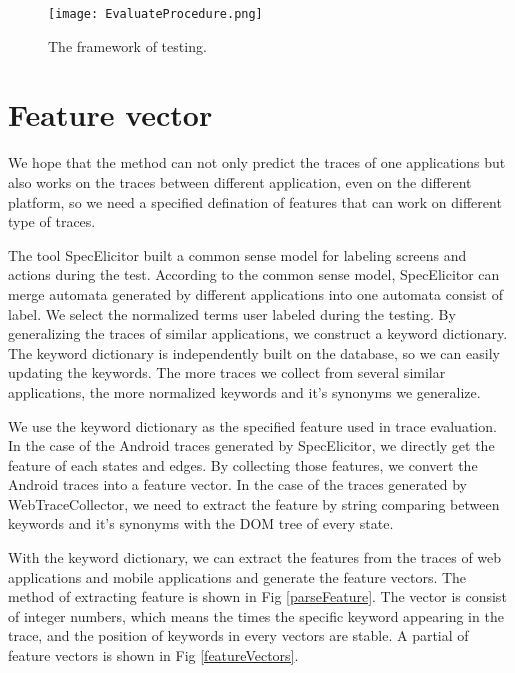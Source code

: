 
\begin{figure}[ht]
	\graphicspath{{pic/}}
	\begin{center}
		\texttt{[image: EvaluateProcedure.png]}
	\end{center}
	\caption{ The framework of testing. }
	\label{EvaluateProcedure}
\end{figure}

\section{Feature vector}

We hope that the method can not only predict the traces of one applications 
but also works on the traces between different application, even on the different platform,
so we need a specified defination of features that can work on different type of traces.

The tool SpecElicitor built a common sense model for labeling screens and actions during the test.
According to the common sense model, 
SpecElicitor can merge automata generated by different applications into one automata consist of label.
We select the normalized terms user labeled during the testing.
By generalizing the traces of similar applications, we construct a keyword dictionary.
The keyword dictionary is independently built on the database,
so we can easily updating the keywords.
The more traces we collect from several similar applications,
the more normalized keywords and it's synonyms we generalize.

We use the keyword dictionary as the specified feature used in trace evaluation.
In the case of the Android traces generated by SpecElicitor,
we directly get the feature of each states and edges.
By collecting those features, we convert the Android traces into a feature vector.
In the case of the traces generated by WebTraceCollector,
we need to extract the feature by string comparing between keywords and it's synonyms with the DOM tree of every state.

With the keyword dictionary, we can extract the features from the traces of web applications and mobile applications
and generate the feature vectors.
The method of extracting feature is shown in Fig \ref{parseFeature}.
The vector is consist of integer numbers, which means the times the specific keyword appearing in the trace,
and the position of keywords in every vectors are stable.
A partial of feature vectors is shown in Fig \ref{featureVectors}.

